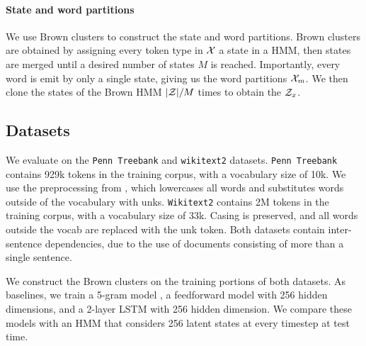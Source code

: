 \documentclass[11pt,a4paper]{article}
\begin{document}
\paragraph{State and word partitions}
We use Brown clusters \citep{brown1992,liang2005brown} to construct the state and word partitions.
Brown clusters are obtained by assigning every token type in $\mathcal{X}$ a state in a HMM,
then states are merged until a desired number of states $M$ is reached.
Importantly, every word is emit by only a single state, giving us the 
word partitions $\mathcal{X}_m$.
We then clone the states of the Brown HMM $|\mathcal{Z}|/M$ times to obtain the $\mathcal{Z}_x$.

\subsection{Datasets}
We evaluate on the \texttt{Penn Treebank} \citep{ptb}
and \texttt{wikitext2} \citep{wikitext} datasets.
\texttt{Penn Treebank} contains 929k tokens in the training corpus,
with a vocabulary size of 10k.
We use the preprocessing from \citet{mikolov-2011},
which lowercases all words and substitutes words outside of the vocabulary with unks. 
\texttt{Wikitext2} contains 2M tokens in the training corpus,
with a vocabulary size of 33k.
Casing is preserved, and all words outside the vocab are replaced with the unk token.
Both datasets contain inter-sentence dependencies,
due to the use of documents consisting of more than a single sentence.

We construct the Brown clusters on the training portions of both datasets.
As baselines, we train a 5-gram model \citep{kenlm},
a feedforward model with 256 hidden dimensions,
and a 2-layer LSTM with 256 hidden dimension.
We compare these models with an HMM that considers 256 latent states
at every timestep at test time.

\end{document}
